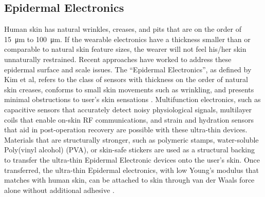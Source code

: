 \documentclass{sigchi}
\begin{document}


\subsection{Epidermal Electronics}
Human skin has natural wrinkles, creases, and pits that are on the order of \SI{15}{\micro\metre} to \SI{100}{\micro\metre}\cite{Tchvialeva:2014wla}. If the wearable electronics have a thickness smaller than or comparable to natural skin feature sizes, the wearer will not feel his/her skin unnaturally restrained\cite{Kim:2011bv}. Recent approaches have worked to address these epidermal surface and scale issues. The “Epidermal Electronics”, as defined by Kim et al, refers to the class of sensors with thickness on the order of natural skin creases, conforms to small skin movements such as wrinkling, and presents minimal obstructions to user's skin sensations \cite{Kim:2011bv}. Multifunction electronics, such as capacitive sensors that accurately detect noisy physiological signals, multilayer coils that enable on-skin RF communications, and strain and hydration sensors that aid in post-operation recovery\cite{Jeong:2013km,Kim:2014iq,Bandodkar:2014dl,Kim:2011bv} are possible with these ultra-thin devices. Materials that are structurally stronger, such as polymeric stamps, water-soluble Poly(vinyl alcohol) (PVA), or skin-safe stickers are used as a structural backing to transfer the ultra-thin Epidermal Electronic devices onto the user's skin\cite{Son:2014iya}. Once transferred, the ultra-thin Epidermal electronics, with low Young's modulus that matches with human skin, can be attached to skin through van der Waals force alone without additional adhesive \cite{Son:2014iya,Kim:2011bv}. 
\end{document}
